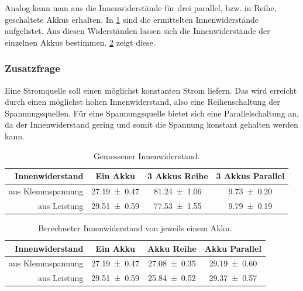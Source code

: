 \documentclass[
	a4paper,
	12pt,
	pagesize,
	ngerman
]{scrartcl}
\begin{document}
	Analog kann man aus  die Innenwiderstände für drei parallel, bzw. in Reihe, geschaltete Akkus erhalten.
	In \cref{Tabelle_Innenwiderstaende} sind die ermittelten Innenwiderstände aufgelistet. 
	Aus diesen Widerständen lassen sich die Innenwiderstände der einzelnen Akkus bestimmen.
	\cref{Tabelle_Innenwiderstaende2} zeigt diese. %


	\subsubsection*{Zusatzfrage}
	Eine Stromquelle soll einen möglichst konstanten Strom liefern. Das wird erreicht durch einen möglichst hohen Innenwiderstand, also eine Reihenschaltung der Spannungsquellen. Für eine Spannungsquelle bietet sich eine Parallelschaltung an, da der Innenwiderstand gering und somit die Spannung konstant gehalten werden kann.
	\begin{table}[tb]
		\centering
		\begin{tabular}{ r | c | c | c}
			Innenwiderstand& Ein Akku & 3 Akkus Reihe & 3 Akkus Parallel \\ \hline
			aus Klemmspannung& \SI{27,19 \pm 0,47 }{\Omega}& \SI{81,24 \pm 1,06 }{\Omega}&  \SI{9,73 \pm 0,20 }{\Omega} \\
			aus Leistung & \SI{29,51 \pm 0,59 }{\Omega}&  \SI{77,53 \pm 1,55 }{\Omega}&  \SI{9,79 \pm 0,19 }{\Omega}\\

		\end{tabular}
		\caption{Gemessener Innenwiderstand.} %
		\label{Tabelle_Innenwiderstaende} 
	\end{table}
	\begin{table}[tb]
		\centering
		\begin{tabular}{ r | c | c | c}
			Innenwiderstand& Ein Akku & Akku Reihe & Akku Parallel \\ \hline
			aus Klemmspannung& \SI{27,19 \pm 0,47 }{\Omega}& \SI{27,08 \pm 0,35 }{\Omega}&  \SI{29,19 \pm 0,60 }{\Omega} \\
			aus Leistung & \SI{29,51 \pm 0,59 }{\Omega}&  \SI{25,84 \pm 0,52 }{\Omega}&  \SI{29,37 \pm 0,57 }{\Omega}\\

		\end{tabular}
		\caption{Berechneter Innenwiderstand von jeweils einem Akku.} %
		\label{Tabelle_Innenwiderstaende2} 
	\end{table}
\end{document}
